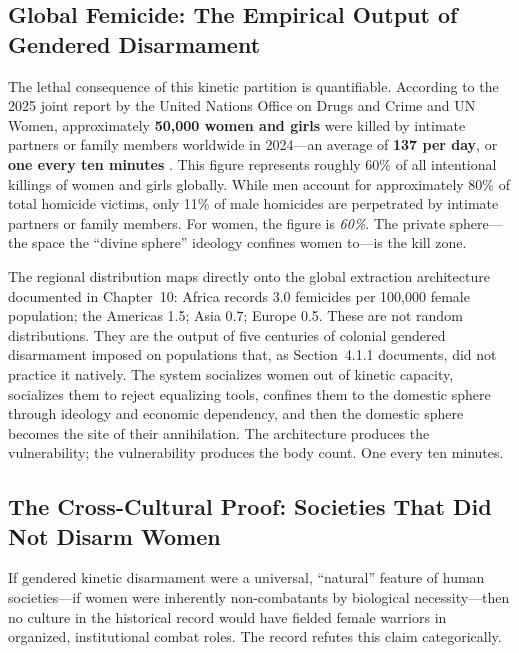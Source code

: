 \documentclass[12pt,openany]{book}
\begin{document}
\subsection{Global Femicide: The Empirical Output of Gendered Disarmament}

The lethal consequence of this kinetic partition is quantifiable. According to the 2025 joint report by the United Nations Office on Drugs and Crime and UN Women, approximately \textbf{50,000 women and girls} were killed by intimate partners or family members worldwide in 2024---an average of \textbf{137 per day}, or \textbf{one every ten minutes} \cite{unodc_femicide}. This figure represents roughly 60\% of all intentional killings of women and girls globally. While men account for approximately 80\% of total homicide victims, only 11\% of male homicides are perpetrated by intimate partners or family members. For women, the figure is \textit{60\%}. The private sphere---the space the ``divine sphere'' ideology confines women to---is the kill zone.

The regional distribution maps directly onto the global extraction architecture documented in Chapter~10: Africa records 3.0 femicides per 100,000 female population; the Americas 1.5; Asia 0.7; Europe 0.5. These are not random distributions. They are the output of five centuries of colonial gendered disarmament imposed on populations that, as Section~4.1.1 documents, did not practice it natively. The system socializes women out of kinetic capacity, socializes them to reject equalizing tools, confines them to the domestic sphere through ideology and economic dependency, and then the domestic sphere becomes the site of their annihilation. The architecture produces the vulnerability; the vulnerability produces the body count. One every ten minutes.

\subsection{The Cross-Cultural Proof: Societies That Did Not Disarm Women}

If gendered kinetic disarmament were a universal, ``natural'' feature of human societies---if women were inherently non-combatants by biological necessity---then no culture in the historical record would have fielded female warriors in organized, institutional combat roles. The record refutes this claim categorically.
\end{document}

